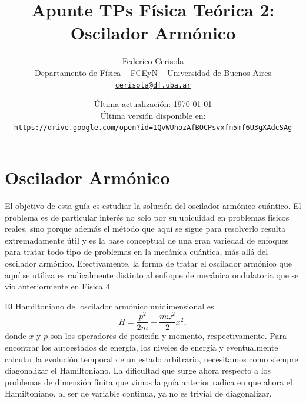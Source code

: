 \documentclass[10pt, a4paper]{article}
\numberwithin{equation}{subsection}
\begin{document}
\title{Apunte TPs Física Teórica 2: Oscilador Armónico}
\author{Federico Cerisola
  \\ \small{Departamento de Física -- FCEyN -- Universidad de Buenos Aires}
  \\ \small{\href{mailto:cerisola@df.uba.ar}{\nolinkurl{cerisola@df.uba.ar}}}
}
\date{\small Última actualización: \today \\[1em]
  Última versión disponible en: \\
  \texttt{
    \href{https://drive.google.com/open?id=1QvWUhozAfBOCPsvxfm5mf6U3gXAdcSAg}
    {https://drive.google.com/open?id=1QvWUhozAfBOCPsvxfm5mf6U3gXAdcSAg}
  }}
\maketitle
\thispagestyle{empty}

\vfill
\doclicenseThis

\pagebreak

\newpage
  \tableofcontents
\newpage

\section{Oscilador Armónico}

El objetivo de esta guía es estudiar la solución del oscilador armónico
cuántico. El problema es de particular interés no solo por su ubicuidad en
problemas físicos reales, sino porque además el método que aquí se sigue para
resolverlo resulta extremadamente útil y es la base conceptual de una gran
variedad de enfoques para tratar todo tipo de problemas en la mecánica
cuántica, más allá del oscilador armónico. Efectivamente, la forma de tratar el
oscilador armónico que aquí se utiliza es radicalmente distinto al enfoque de
mecánica ondulatoria que se vio anteriormente en Física 4.

El Hamiltoniano del oscilador armónico unidimensional es
\begin{equation}
  H = \frac{p^2}{2m} + \frac{m\omega^2}{2}x^2,
\end{equation}
donde $x$ y $p$ son los operadores de posición y momento, respectivamente.
Para encontrar los autoestados de energía, los niveles de energía y
eventualmente calcular la evolución temporal de un estado arbitrario,
necesitamos como siempre diagonalizar el Hamiltoniano. La dificultad que surge
ahora respecto a los problemas de dimensión finita que vimos la guía anterior
radica en que ahora el Hamiltoniano, al ser de variable continua, ya no es
trivial de diagonalizar.
\end{document}
